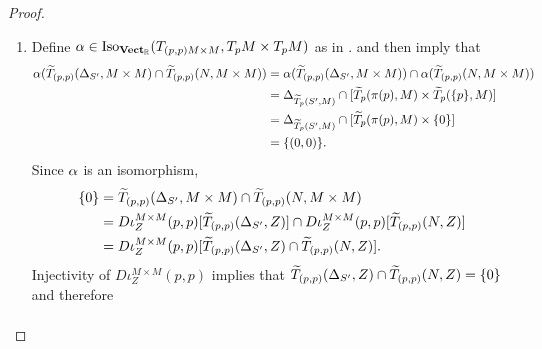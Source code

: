 \documentclass{book}
\begin{document}
\begin{proof}
\begin{enumerate}
\begin{enumerate}
\begin{itemize}
					\begin{align*}
						\prj_2(a, p) 
						& = p \\
						& \in S',
					\end{align*}
					we have that 
					\begin{align*}
						N 
						& \subset \prj_2^{-1}(S') \cap R \\
						& = \prj_2|_R^{-1}(S') \\
						& = Z.
					\end{align*}
				\end{itemize}
				Since $Z$ is an embedded submanifold of $R$ and $R$ is an embedded submanifold of $M \times M$,  implies that $Z$ is an embedded submanifold of $M \times M$. Since $\Del_{S'}, N \subset Z$ and $\Del_{S'}, N$ are embedded submanifolds of $M \times M$,  then implies that $\Del_{S'}, N$ are embedded submanifolds of $Z$. 
				\item Define $\alpha \in \operatorname{Iso}_{\operatorname*{\text{\textbf{Vect}}_{\mathbb{R}}}}(T_{(p,p) M \times M}, T_pM \times T_p M)$ as in .  and  then imply that
				\begin{align*}
					\alpha(\widetilde{T}_{(p,p)} (\Delta_{S'}, M \times M) \cap \widetilde{T}_{(p,p)} (N, M \times M)) 
					& = \alpha(\widetilde{T}_{(p,p)} (\Delta_{S'}, M \times M)) \cap \alpha(\widetilde{T}_{(p,p)} (N, M \times M)) \\
					& = \Delta_{\widetilde{T}_p (S', M)} \cap [\widetilde{T}_p (\pi(p), M) \times \widetilde{T}_p (\{p\}, M)] \\
					& = \Delta_{\widetilde{T}_p (S', M)} \cap [\widetilde{T}_p (\pi(p), M) \times \{0\}] \\
					& = \{(0,0)\}.
				\end{align*}
				Since $\alpha$ is an isomorphism, 
				\begin{align*}
					\{0\}
					& = \widetilde{T}_{(p,p)} (\Delta_{S'}, M \times M) \cap \widetilde{T}_{(p,p)} (N, M \times M) \\
					& = D \iota_Z^{M \times M} (p,p) [\widetilde{T}_{(p,p)} (\Delta_{S'}, Z)] \cap D \iota_Z^{M \times M} (p,p) [\widetilde{T}_{(p,p)} (N, Z)] \\
					& = D \iota_Z^{M \times M} (p,p) [\widetilde{T}_{(p,p)} (\Delta_{S'}, Z) \cap \widetilde{T}_{(p,p)} (N, Z)]. 
				\end{align*} 
				Injectivity of $D \iota_Z^{M \times M} (p,p)$ implies that $\widetilde{T}_{(p,p)} (\Delta_{S'}, Z) \cap \widetilde{T}_{(p,p)} (N, Z) = \{0\}$ and therefore
				\begin{align*}

\end{align*}
\end{enumerate}
\end{enumerate}
\end{proof}
\end{document}
